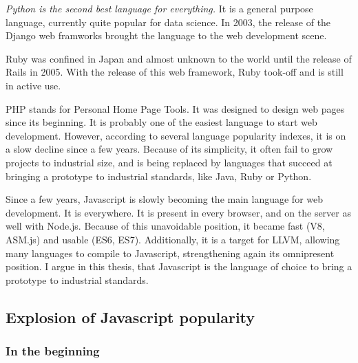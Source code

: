 \textit{Python is the second best language for everything.}
It is a general purpose language, currently quite popular for data science.
In 2003, the release of the Django web framworks brought the language to the web development scene.

Ruby was confined in Japan and almost unknown to the world until the release of Rails in 2005.
With the release of this web framework, Ruby took-off and is still in active use.

PHP stands for Personal Home Page Tools.
It was designed to design web pages since its beginning.
It is probably one of the easiest language to start web development.
However, according to several language popularity indexes, it is on a slow decline since a few years.
Because of its simplicity, it often fail to grow projects to industrial size, and is being replaced by languages that succeed at bringing a prototype to industrial standards, like Java, Ruby or Python.


Since a few years, Javascript is slowly becoming the main language for web development.
It is everywhere.
It is present in every browser, and on the server as well with Node.js.
Because of this unavoidable position, it became fast (V8, ASM.js) and usable (ES6, ES7).
Additionally, it is a target for LLVM, allowing many languages to compile to Javascript, strengthening again its omnipresent position.
I argue in this thesis, that Javascript is the language of choice to bring a prototype to industrial standards.

\subsection{Explosion of Javascript popularity}

\subsubsection{In the beginning}

